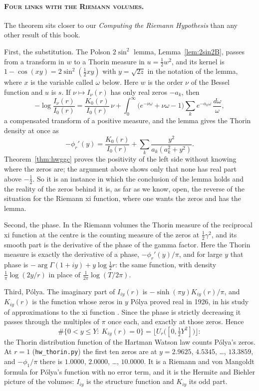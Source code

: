 \paragraph{\normalfont\scshape Four links with the Riemann volumes.} The theorem sits closer to our \emph{Computing the Riemann Hypothesis} \cite{PS26a,PS26b,PS26c} than any other result of this book.

First, the substitution. The Polson $2\sin^2$ lemma, Lemma~\ref{lem:2sin2B}, passes from a transform in $w$ to a Thorin measure in $u=\frac12w^2$, and its kernel is $1-\cos(xy)=2\sin^2(\frac12xy)$ with $y=\sqrt{2z}$ in the notation of the lemma, where $x$ is the variable called $\omega$ below. Here $w$ is the order $\nu$ of the Bessel function and $u$ is $s$. If $\nu\mapsto I_\nu(r)$ has only real zeros $-a_k$, then
\[
-\log\frac{I_\nu(r)}{I_0(r)}=\frac{K_0(r)}{I_0(r)}\,\nu+\int_0^\infty\big(e^{-\nu\omega}+\nu\omega-1\big)\sum_ke^{-a_k\omega}\,\frac{d\omega}{\omega},
\]
a compensated transform of a positive measure, and the lemma gives the Thorin density at once as
\[
-\phi_r'(y)=\frac{K_0(r)}{I_0(r)}+\sum_k\frac{y^2}{a_k(a_k^2+y^2)} .
\]
Theorem~\ref{thm:hwggc} proves the positivity of the left side without knowing where the zeros are; the argument above shows only that none has real part above $-\frac12$. So it is an instance in which the conclusion of the lemma holds and the reality of the zeros behind it is, as far as we know, open, the reverse of the situation for the Riemann xi function, where one wants the zeros and has the lemma.

Second, the phase. In the Riemann volumes the Thorin measure of the reciprocal xi function at the centre is the counting measure of the zeros at $\frac12\gamma^2$, and its smooth part is the derivative of the phase of the gamma factor. Here the Thorin measure is exactly the derivative of a phase, $-\phi_r'(y)/\pi$, and for large $y$ that phase is $-\arg\Gamma(1+iy)+y\log\frac12r$: the same function, with density $\frac1\pi\log(2y/r)$ in place of $\frac1{2\pi}\log(T/2\pi)$.

Third, P\'olya. The imaginary part of $I_{iy}(r)$ is $-\sinh(\pi y)K_{iy}(r)/\pi$, and $K_{iy}(r)$ is the function whose zeros in $y$ P\'olya proved real in 1926, in his study of approximations to the xi function \cite{Po26}. Since the phase is strictly decreasing it passes through the multiples of $\pi$ once each, and exactly at those zeros. Hence
\[
\#\{0<y\le Y:\ K_{iy}(r)=0\}=\big\lfloor U_r\big([0,\tfrac12Y^2]\big)\big\rfloor :
\]
the Thorin distribution function of the Hartman Watson law counts P\'olya's zeros. At $r=1$ (\texttt{hw\_thorin.py}) the first ten zeros are at $y=2.9625$, $4.5345$, \dots, $13.3859$, and $-\phi_1/\pi$ there is $1.0000$, $2.0000$, \dots, $10.0000$. It is a Riemann and von Mangoldt formula for P\'olya's function with no error term, and it is the Hermite and Biehler picture of the volumes: $I_{iy}$ is the structure function and $K_{iy}$ its odd part.

